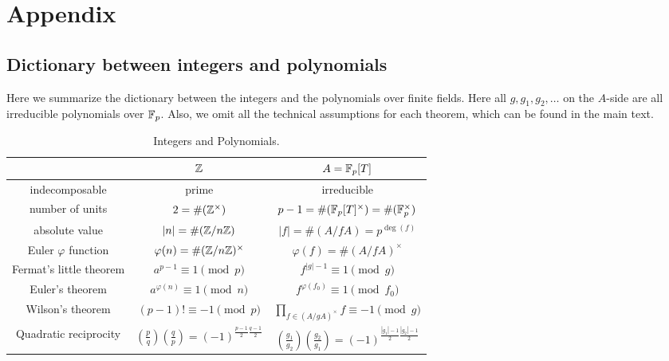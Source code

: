 \appendix
\section{Appendix}


\subsection{Dictionary between integers and polynomials}
\label{subsec:dictionary}

Here we summarize the dictionary between the integers and the polynomials over finite fields.
Here all $g, g_1, g_2, \dots$ on the $A$-side are all irreducible polynomials over $\mathbb{F}_p$.
Also, we omit all the technical assumptions for each theorem, which can be found in the main text.

\begin{table}[h]
    \begin{center}
        \begin{tabular}{c|c|c}
            \toprule
            & $\mathbb{Z}$ & $A = \mathbb{F}_p[T]$ \\
            \midrule
            indecomposable & prime & irreducible \\
            number of units &$2 = \#(\mathbb{Z}^\times)$ & $p - 1 = \# (\mathbb{F}_p[T]^\times) = \# (\mathbb{F}_p^\times)$ \\
            absolute value & $|n| = \# (\mathbb{Z} / n\mathbb{Z})$ & $|f| = \# (A / f A) = p^{\deg (f)}$ \\
            Euler $\varphi$ function & $\varphi(n) = \# (\mathbb{Z} / n \mathbb{Z})^\times$ & $\varphi(f) = \# (A / fA)^\times$ \\
            Fermat's little theorem & $a^{p-1} \equiv 1 \pmod{p}$ & $f^{|g| - 1} \equiv 1 \pmod{g}$ \\
            Euler's theorem & $a^{\varphi(n)} \equiv 1 \pmod{n}$ & $f^{\varphi(f_0)} \equiv 1 \pmod{f_0}$ \\
            Wilson's theorem & $(p-1)! \equiv -1 \pmod{p}$ & $\prod_{f \in (A / g A)^\times} f \equiv -1 \pmod{g}$ \\
            Quadratic reciprocity & $\left(\frac{p}{q}\right)\left(\frac{q}{p}\right) = (-1)^{\frac{p-1}{2}\frac{q-1}{2}}$ & $\left(\frac{g_1}{g_2}\right)\left(\frac{g_2}{g_1}\right) = (-1)^{\frac{|g_1| - 1}{2}\frac{|g_2| - 1}{2}}$\\
            \bottomrule
        \end{tabular}
        \caption{Integers and Polynomials.}
        \label{tab:dictionary}
    \end{center}
\end{table}

